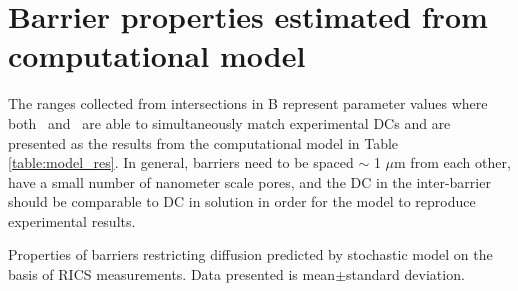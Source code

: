 \section{Barrier properties estimated from computational model}

The ranges collected from intersections in \F{\ref{fig:model_res}}B
represent parameter values where both \ATP\ and \DEX\ are able to simultaneously
match experimental \acp{DC} and are presented as the results from the
computational  model in Table \ref{table:model_res}. In general,
barriers need to be spaced $\sim$ 1 $\mu$m from each other, have a small
number of nanometer scale pores, and the \ac{DC} in the inter-barrier
should be comparable to \ac{DC} in solution in order for the model to
reproduce experimental results.
\begin{table}
\begin{center}

\end{center}
\caption[Properties of barriers restricting diffusion]{Properties of
barriers restricting diffusion predicted by stochastic model on the
basis of RICS measurements. Data presented is mean$\pm$standard
deviation.}
\label{table:model_res}
\end{table}

